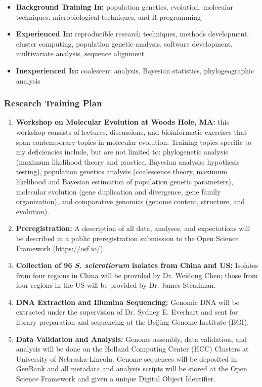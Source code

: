 \documentclass[12pt,letterpaper]{article}
\begin{document}
\begin{itemize}
  \item \textbf{Background Training In:} population genetics, evolution, molecular techniques, microbiological techniques, and R programming
  \item \textbf{Experienced In:} reproducible research techniques, methods development, cluster computing, population genetic analysis, software development, multivariate analysis, sequence alignment
  \item \textbf{Inexperienced In:} coalescent analysis, Bayesian statistics, phylogeographic analysis
\end{itemize}

\subsubsection{Research Training Plan}

\begin{enumerate}
  \item \textbf{Workshop on Molecular Evolution at Woods Hole, MA:} this workshop consists of lectures, discussions, and bioinformatic exercises that span contemporary topics in molecular evolution. Training topics specific to my deficiencies include, but are not limited to: phylogenetic analysis (maximum likelihood theory and practice, Bayesian analysis; hypothesis testing), population genetics analysis (coalescence theory, maximum likelihood and Bayesian estimation of population genetic parameters), molecular evolution (gene duplication and divergence, gene family organization), and comparative genomics (genome content, structure, and evolution).
  \item \textbf{Preregistration:} A description of all data, analyses, and expectations will be described in a public preregistration submission to the Open Science Framework (\url{https://osf.io/}).
  \item \textbf{Collection of 96 \textit{S. sclerotiorum} isolates from China and US:} Isolates from four regions in China will be provided by Dr. Weidong Chen; those from four regions in the US will be provided by Dr. James Steadman. 
  \item \textbf{DNA Extraction and Illumina Sequencing:} Genomic DNA will be extracted under the supervision of Dr. Sydney E. Everhart and sent for library preparation and sequencing at the Beijing Genome Institute (BGI). 
  \item \textbf{Data Validation and Analysis:} Genome assembly, data validation,
  and analysis will be done on the Holland Computing Center (HCC) Clusters at University of Nebraska-Lincoln. Genome sequences will be deposited in GenBank and all metadata and analysis scripts will be stored at the Open Science Framework and given a unique Digital Object Identifier.
\end{enumerate}
\end{document}
